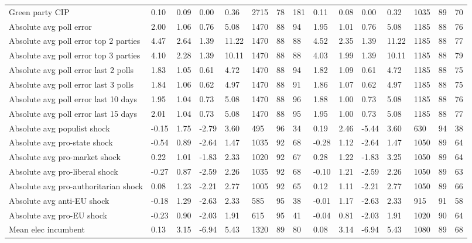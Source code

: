 \begin{longtable}{lllllllllllllll}
Green party CIP & 0.10 & 0.09 & 0.00 & 0.36 & 2715 & 78 & 181 & 0.11 & 0.08 & 0.00 & 0.32 & 1035 & 89 & 70\\
Absolute avg poll error & 2.00 & 1.06 & 0.76 & 5.08 & 1470 & 88 & 94 & 1.95 & 1.01 & 0.76 & 5.08 & 1185 & 88 & 76\\
Absolute avg poll error top 2 parties & 4.47 & 2.64 & 1.39 & 11.22 & 1470 & 88 & 88 & 4.52 & 2.35 & 1.39 & 11.22 & 1185 & 88 & 77\\
\addlinespace
Absolute avg poll error top 3 parties & 4.10 & 2.28 & 1.39 & 10.11 & 1470 & 88 & 88 & 4.03 & 1.99 & 1.39 & 10.11 & 1185 & 88 & 79\\
Absolute avg poll error last 2 polls & 1.83 & 1.05 & 0.61 & 4.72 & 1470 & 88 & 94 & 1.82 & 1.09 & 0.61 & 4.72 & 1185 & 88 & 75\\
Absolute avg poll error last 3 polls & 1.84 & 1.06 & 0.62 & 4.97 & 1470 & 88 & 91 & 1.86 & 1.07 & 0.62 & 4.97 & 1185 & 88 & 75\\
Absolute avg poll error last 10 days & 1.95 & 1.04 & 0.73 & 5.08 & 1470 & 88 & 96 & 1.88 & 1.00 & 0.73 & 5.08 & 1185 & 88 & 76\\
Absolute avg poll error last 15 days & 2.01 & 1.04 & 0.73 & 5.08 & 1470 & 88 & 95 & 1.95 & 1.00 & 0.73 & 5.08 & 1185 & 88 & 77\\
\addlinespace
Absolute avg populist shock & -0.15 & 1.75 & -2.79 & 3.60 & 495 & 96 & 34 & 0.19 & 2.46 & -5.44 & 3.60 & 630 & 94 & 38\\
Absolute avg pro-state shock & -0.54 & 0.89 & -2.64 & 1.47 & 1035 & 92 & 68 & -0.28 & 1.12 & -2.64 & 1.47 & 1050 & 89 & 64\\
Absolute avg pro-market shock & 0.22 & 1.01 & -1.83 & 2.33 & 1020 & 92 & 67 & 0.28 & 1.22 & -1.83 & 3.25 & 1050 & 89 & 64\\
Absolute avg pro-liberal shock & -0.27 & 0.87 & -2.59 & 2.26 & 1035 & 92 & 68 & -0.10 & 1.21 & -2.59 & 2.26 & 1050 & 89 & 63\\
Absolute avg pro-authoritarian shock & 0.08 & 1.23 & -2.21 & 2.77 & 1005 & 92 & 65 & 0.12 & 1.11 & -2.21 & 2.77 & 1050 & 89 & 66\\
\addlinespace
Absolute avg anti-EU shock & -0.18 & 1.29 & -2.63 & 2.33 & 585 & 95 & 38 & -0.01 & 1.17 & -2.63 & 2.33 & 915 & 91 & 58\\
Absolute avg pro-EU shock & -0.23 & 0.90 & -2.03 & 1.91 & 615 & 95 & 41 & -0.04 & 0.81 & -2.03 & 1.91 & 1020 & 90 & 64\\
Mean elec incumbent & 0.13 & 3.15 & -6.94 & 5.43 & 1320 & 89 & 80 & 0.08 & 3.14 & -6.94 & 5.43 & 1080 & 89 & 68\\

\end{longtable}
